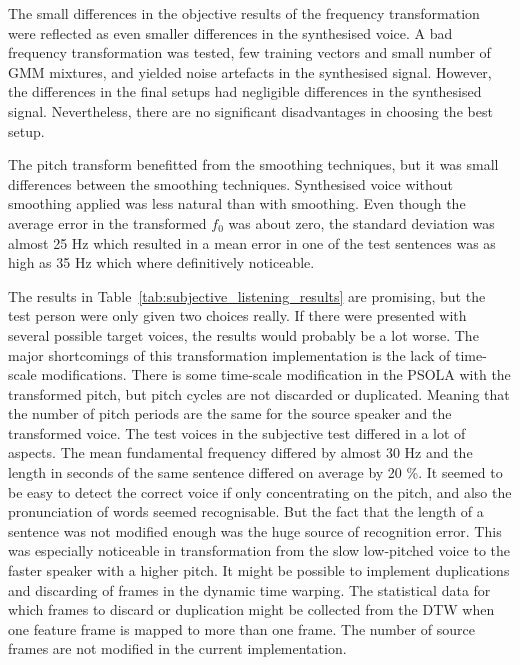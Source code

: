 The small differences in the objective results of the frequency transformation were reflected as even smaller differences in the synthesised voice. A bad frequency transformation was tested, \ie few training vectors and small number of GMM mixtures, and yielded noise artefacts in the synthesised signal. However, the differences in the final setups had negligible differences in the synthesised signal. Nevertheless, there are no significant disadvantages in choosing the best setup.

The pitch transform benefitted from the smoothing techniques, but it was small differences between the smoothing techniques. Synthesised voice without smoothing applied was less natural than with smoothing. Even though the average error in the transformed $f_0$ was about zero, the standard deviation was almost 25 Hz which resulted in a mean error in one of the test sentences was as high as 35 Hz which where definitively noticeable.

The results in Table~\ref{tab:subjective_listening_results} are promising, but the test person were only given two choices really. If there were presented with several possible target voices, the results would probably be a lot worse. The major shortcomings of this transformation implementation is the lack of time-scale modifications. There is some time-scale modification in the PSOLA with the transformed pitch, but pitch cycles are not discarded or duplicated. Meaning that the number of pitch periods are the same for the source speaker and the transformed voice. The test voices in the subjective test differed in a lot of aspects. The mean fundamental frequency differed by almost 30 Hz and the length in seconds of the same sentence differed on average by 20 \%. It seemed to be easy to detect the correct voice if only concentrating on the pitch, and also the pronunciation of words seemed recognisable. But the fact that the length of a sentence was not modified enough was the huge source of recognition error. This was especially noticeable in transformation from the slow low-pitched voice to the faster speaker with a higher pitch. It might be possible to implement duplications and discarding of frames in the dynamic time warping. The statistical data for which frames to discard or duplication might be collected from the DTW when one feature frame is mapped to more than one frame. The number of source frames are not modified in the current implementation.


